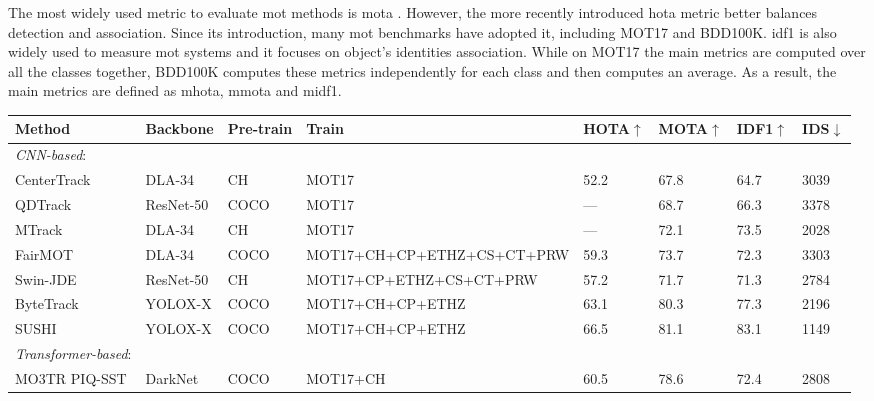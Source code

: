  The most widely used metric to evaluate \ac{mot} methods is \ac{mota} \cite{Bernardin2008EvaluatingMO}. However, the more recently introduced \ac{hota} \cite{Luiten2020IJCV} metric better balances detection and association. Since its introduction, many \ac{mot} benchmarks have adopted it, including MOT17 and BDD100K. \ac{idf1} \cite{10.1007/978-3-319-48881-3_2} is also widely used to measure \ac{mot} systems and it focuses on object's identities association. While on MOT17 the main metrics are computed over all the classes together, BDD100K computes these metrics independently for each class and then computes an average. As a result, the main metrics are defined as \ac{mhota}, \ac{mmota} and \ac{midf1}. 

\begin{table*}[t]
    \centering \footnotesize
    \begin{tabular}{llllllll}
         \toprule
        Method             & Backbone   & Pre-train & Train  & HOTA$\uparrow$ & MOTA$\uparrow$ & IDF1$\uparrow$  & IDS$\downarrow$ \\ 
        \midrule
        \textit{CNN-based}: &&&&&&& \\
        CenterTrack \cite{zhou2020tracking}    &  DLA-34 & CH      & MOT17      & 52.2   & 67.8      & 64.7      & 3039  \\
        QDTrack \cite{cvpr_qdtrack}    & ResNet-50 & COCO      & MOT17      & ---   & 68.7      & 66.3      & 3378  \\
        MTrack \cite{yu2022towards}    & DLA-34    & CH        & MOT17      & ---   & 72.1      & 73.5      & 2028  \\
        FairMOT \cite{zhang2021fairmot}& DLA-34    & COCO      & MOT17+CH+CP+ETHZ+CS+CT+PRW & 59.3  & 73.7      & 72.3      & 3303  \\ 
        Swin-JDE \cite{tsai2023swinJDE}& ResNet-50 & CH        & MOT17+CP+ETHZ+CS+CT+PRW & 57.2   & 71.7  & 71.3 & 2784 \\
        ByteTrack \cite{ByteTrack}     & YOLOX-X   & COCO      & MOT17+CH+CP+ETHZ  & 63.1 & 80.3   & 77.3      & 2196 \\
        SUSHI \cite{Cetintas_2023_CVPR}     & YOLOX-X   & COCO      & MOT17+CH+CP+ETHZ  & 66.5 & 81.1   & 83.1      & 1149 \\
         \midrule
        \textit{Transformer-based}: &&&&&&& \\
        MO3TR PIQ-SST \cite{zhu2022looking} & DarkNet & COCO      & MOT17+CH  & 60.5      & 78.6     & 72.4 & 2808 \\

\end{tabular}
\end{table*}
